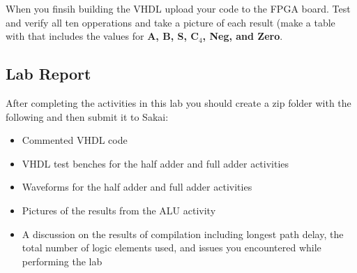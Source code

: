 When you finsih building the VHDL upload your code to the FPGA board. Test and verify all ten opperations and take a picture of each result (make a table with that includes the values for {\bf A, B, S, C$_4$, Neg, and Zero}.
\subsection{Lab Report}
After completing the activities in this lab you should create a zip folder with the following and then submit it to Sakai:

\begin{itemize}
	\item Commented VHDL code
	\item VHDL test benches for the half adder and full adder activities
	\item Waveforms for the half adder and full adder activities
	\item Pictures of the results from the ALU activity 
	\item A discussion on the results of compilation including longest path delay, the total number of logic elements used, and issues you encountered while performing the lab
\end{itemize}

